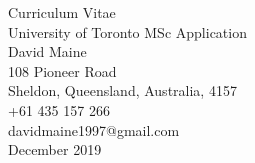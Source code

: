 \begin{titlepage}
    \vspace*{5em}
    \begin{center}
        \huge{Curriculum Vitae} \\[0.2em]
        \LARGE{University of Toronto MSc Application} \\[2em]
        \large{
            David Maine\\
            108 Pioneer Road\\ 
            Sheldon, Queensland, Australia, 4157\\
            +61 435 157 266\\
            davidmaine1997@gmail.com\\[2em]
            December 2019
        }
    \end{center}
    \vspace*{\fill}
\end{titlepage}
\restoregeometry